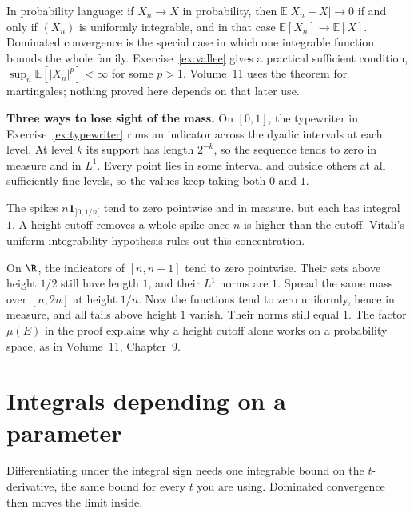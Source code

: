 In probability language: if \(X_n\to X\) in probability, then \(\mathbb E|X_n-X|\to0\) if and only if \((X_n)\) is uniformly integrable, and in that case \(\mathbb E[X_n]\to\mathbb E[X]\). Dominated convergence is the special case in which one integrable function bounds the whole family. Exercise~\ref{ex:vallee} gives a practical sufficient condition, \(\sup_n\mathbb E[|X_n|^p]<\infty\) for some \(p>1\). Volume~11 uses the theorem for martingales; nothing proved here depends on that later use.

\textbf{Three ways to lose sight of the mass.}
On \([0,1]\), the typewriter in Exercise~\ref{ex:typewriter} runs an indicator across the dyadic intervals at each level. At level \(k\) its support has length \(2^{-k}\), so the sequence tends to zero in measure and in \(L^1\). Every point lies in some interval and outside others at all sufficiently fine levels, so the values keep taking both \(0\) and \(1\).

The spikes \(n\mathbf 1_{]0,1/n[}\) tend to zero pointwise and in measure, but each has integral \(1\). A height cutoff removes a whole spike once \(n\) is higher than the cutoff. Vitali's uniform integrability hypothesis rules out this concentration.

On \(\R\), the indicators of \([n,n+1]\) tend to zero pointwise. Their sets above height \(1/2\) still have length \(1\), and their \(L^1\) norms are \(1\). Spread the same mass over \([n,2n]\) at height \(1/n\). Now the functions tend to zero uniformly, hence in measure, and all tails above height \(1\) vanish. Their norms still equal \(1\). The factor \(\mu(E)\) in the proof explains why a height cutoff alone works on a probability space, as in Volume~11, Chapter~9.

\section{Integrals depending on a parameter}

Differentiating under the integral sign needs one integrable bound on the \(t\)-derivative, the same bound for every \(t\) you are using. Dominated convergence then moves the limit inside.

